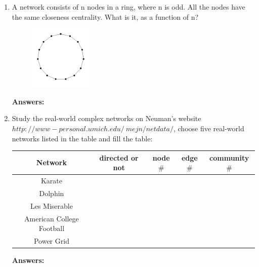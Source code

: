 \documentclass{amsart}
\theoremstyle{definition}
\theoremstyle{remark}
\numberwithin{equation}{section}
\begin{document}
\begin{enumerate}
\item A network consists of n nodes in a ring, where n is odd. All the nodes have the same closeness centrality. What is it, as a function of n? \vspace{0.2cm}


\begin{figure}[h]
\includegraphics[width=0.2\linewidth]{images/hw3_figure1.PNG}
\end{figure}

\vspace{0.2cm}

\textbf{Answers:}

\clearpage
\item Study the real-world complex networks on Neuman's website $http://www-personal.umich.edu/~mejn/netdata/$, choose five real-world networks listed in the table and fill the table:

\begin{center}
\begin{tabular}{|c|c|c|c|c|}\hline
Network & directed or not  &node$ \#$	 & edge$ \#$ & community$ \# $ \\ \hline
Karate  & &  &  &   \\ \hline
Dolphin & &  &  &   \\ \hline
Les Miserable& &  &  &   \\ \hline
American College Football & &  &  &   \\ \hline
Power Grid & &  &  &   \\ \hline
\end{tabular}
\end{center}

\vspace{0.2cm}

\textbf{Answers:}

\vspace{5cm}
\clearpage


\end{enumerate}
\end{document}
